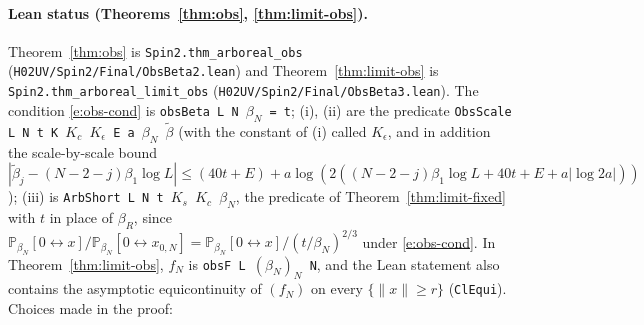 \documentclass[11pt]{amsart}
\theoremstyle{definition}
\theoremstyle{remark}
\numberwithin{equation}{section}
\newcommand{\conn}{\leftrightarrow}
\begin{document}
\paragraph{Lean status (Theorems~\ref{thm:obs}, \ref{thm:limit-obs}).} Theorem~\ref{thm:obs} is \texttt{Spin2.thm\_arboreal\_obs} (\texttt{H02UV/Spin2/Final/ObsBeta2.lean}) and
Theorem~\ref{thm:limit-obs} is \texttt{Spin2.thm\_arboreal\_limit\_obs} (\texttt{H02UV/Spin2/Final/ObsBeta3.lean}). The condition
\eqref{e:obs-cond} is \texttt{obsBeta L N $\beta_N$ = t}; (i), (ii) are the predicate \texttt{ObsScale L N t K $K_c$ $K_\epsilon$ E a $\beta_N$ $\tilde\beta$}
(with the constant of (i) called $K_\epsilon$, and in addition the scale-by-scale bound
$|\tilde\beta_j-(N-2-j)\beta_1\log L|\le(40t+E)+a\log(2((N-2-j)\beta_1\log L+40t+E+a|\log2a|))$); (iii) is
\texttt{ArbShort L N t $K_s$ $K_c$ $\beta_N$}, the predicate of Theorem~\ref{thm:limit-fixed} with $t$ in place of $\beta_R$,
since $\mathbb{P}_{\beta_N}[0\conn x]/\mathbb{P}_{\beta_N}[0\conn x_{0,N}]=\mathbb{P}_{\beta_N}[0\conn x]/(t/\beta_N)^{2/3}$ under \eqref{e:obs-cond}.
In Theorem~\ref{thm:limit-obs}, $f_N$ is \texttt{obsF L $(\beta_N)_N$ N}, and the Lean statement also contains the
asymptotic equicontinuity of $(f_N)$ on every $\{\|x\|\ge r\}$ (\texttt{ClEqui}). Choices made in the proof:
\end{document}
